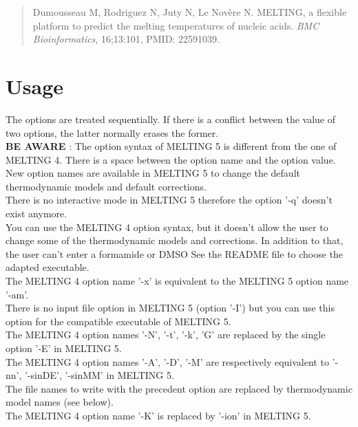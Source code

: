 \documentclass{article}
\begin{document}
\begin{quote}
  Dumousseau M, Rodriguez N, Juty N, Le Nov\`ere N. \textsc{MELTING}, a flexible platform to predict the melting temperatures 
  of nucleic acids. \emph{BMC Bioinformatics}, 16;13:101, PMID: 22591039. 

\end{quote}

\section{Usage}

The options are treated sequentially. If there is a conflict between the value
of two options, the latter normally erases the former.\\

\textbf{BE AWARE} : The option syntax of MELTING 5 is different from the one of MELTING 4. There
is a space between the option name and the option value. New option names are available
in MELTING 5 to change the default thermodynamic models and default corrections.\\
There is no interactive mode in MELTING 5 therefore the option '-q' doesn't exist anymore.\\
You can use the MELTING 4 option syntax, but it doesn't allow the user to change some of 
the thermodynamic models and corrections. In addition to that, the user can't enter a formamide or DMSO %
See the README file to choose the adapted executable.\\
The MELTING 4 option name '-x' is equivalent to the MELTING 5 option name '-am'. \\
There is no input file option in MELTING 5 (option '-I') but you can use this option for the compatible executable
of MELTING 5.\\
The MELTING 4 option names '-N', '-t', '-k', 'G' are replaced by the single option '-E' in MELTING 5. \\
The MELTING 4 option names '-A', '-D', '-M' are respectively equivalent to '-nn', '-sinDE', '-sinMM' in MELTING 5. \\
The file names to write with the precedent option are replaced by thermodynamic model names (see below). \\
The MELTING 4 option name '-K' is replaced by '-ion' in MELTING 5. \\
\end{document}
